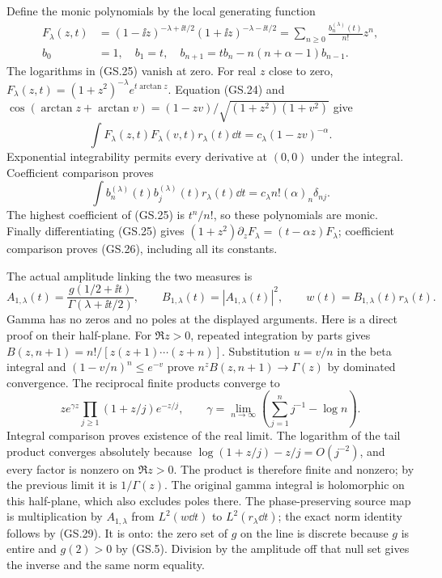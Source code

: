 Define the monic polynomials by the local generating function
\begin{align}
 F_\lambda(z,t)&=(1-\ii z)^{-\lambda+\ii t/2}
                 (1+\ii z)^{-\lambda-\ii t/2}
 =\sum_{n\ge0}\frac{b_n^{(\lambda)}(t)}{n!}z^n,\tag{GS.25}\\
 b_0&=1,\quad b_1=t,\quad
 b_{n+1}=t b_n-n(n+\alpha-1)b_{n-1}.\tag{GS.26}
\end{align}
The logarithms in (GS.25) vanish at zero. For real $z$ close to
zero, $F_\lambda(z,t)=(1+z^2)^{-\lambda}e^{t\arctan z}$.
Equation (GS.24) and
$\cos(\arctan z+\arctan v)=(1-zv)/\sqrt{(1+z^2)(1+v^2)}$
give
\begin{equation}
 \int F_\lambda(z,t)F_\lambda(v,t)r_\lambda(t)\dd t
 =c_\lambda(1-zv)^{-\alpha}.\tag{GS.27}
\end{equation}
Exponential integrability permits every derivative at $(0,0)$
under the integral. Coefficient comparison proves
\begin{equation}
 \int b_n^{(\lambda)}(t)b_j^{(\lambda)}(t)r_\lambda(t)\dd t
 =c_\lambda n!(\alpha)_n\delta_{nj}.\tag{GS.28}
\end{equation}
The highest coefficient of (GS.25) is $t^n/n!$, so these
polynomials are monic. Finally differentiating (GS.25) gives
$(1+z^2)\partial_zF_\lambda=(t-\alpha z)F_\lambda$;
coefficient comparison proves (GS.26), including all its constants.

The actual amplitude linking the two measures is
\begin{equation}
 A_{1,\lambda}(t)=\frac{g(1/2+\ii t)}{\Gamma(\lambda+\ii t/2)},
 \qquad B_{1,\lambda}(t)=|A_{1,\lambda}(t)|^2,
 \qquad w(t)=B_{1,\lambda}(t)r_\lambda(t).\tag{GS.29}
\end{equation}
Gamma has no zeros and no poles at the displayed arguments. Here is
a direct proof on their half-plane. For $\Re z>0$, repeated integration
by parts gives $B(z,n+1)=n!/[z(z+1)\cdots(z+n)]$.
Substitution $u=v/n$ in the beta integral and
$(1-v/n)^n\le e^{-v}$ prove $n^z B(z,n+1)\to\Gamma(z)$ by
dominated convergence. The reciprocal finite products converge to
\[
 z e^{\gamma z}\prod_{j\ge1}(1+z/j)e^{-z/j},\qquad
 \gamma=\lim_{n\to\infty}\left(\sum_{j=1}^n j^{-1}-\log n\right).
\]
Integral comparison proves existence of the real limit. The logarithm
of the tail product converges absolutely because
$\log(1+z/j)-z/j=O(j^{-2})$, and every factor is nonzero on
$\Re z>0$. The product is therefore finite and nonzero; by the
previous limit it is $1/\Gamma(z)$. The original gamma integral is
holomorphic on this half-plane, which also excludes poles there.
The phase-preserving source map is multiplication by $A_{1,\lambda}$
from $L^2(w\dd t)$ to $L^2(r_\lambda\dd t)$; the exact norm
identity follows by (GS.29). It is onto: the zero set of $g$ on
the line is discrete because $g$ is entire and $g(2)>0$ by (GS.5).
Division by the amplitude off that null set gives the inverse and
the same norm equality.

